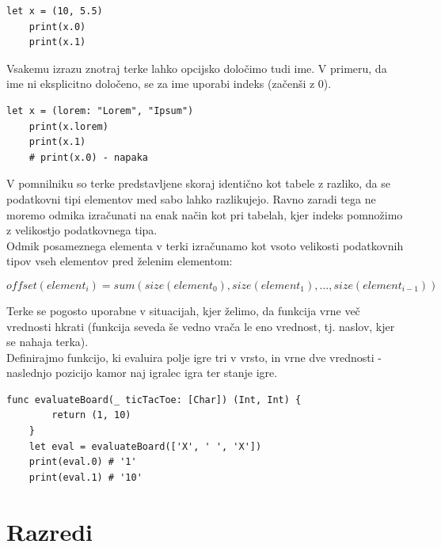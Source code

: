 \documentclass[a4paper, 12p]{book}
\begin{document}
\begin{lstlisting}[caption={Terka, sestavljena iz dveh vrednosti ({\ttfamily Int}, {\ttfamily Double}).}, captionpos=b, label={lst:tuple1}]
	let x = (10, 5.5)
	print(x.0)
	print(x.1)
\end{lstlisting}

Vsakemu izrazu znotraj terke lahko opcijsko določimo tudi ime. V primeru, da ime ni eksplicitno določeno, se za ime uporabi indeks (začenši z 0).

\begin{lstlisting}[caption={Terka s poimenovanim elementom.}, captionpos=b, label={lst:tuple2}]
	let x = (lorem: "Lorem", "Ipsum")
	print(x.lorem)
	print(x.1)
	# print(x.0) - napaka
\end{lstlisting}

\indent V pomnilniku so terke predstavljene skoraj identično kot tabele z razliko, da se podatkovni tipi elementov med sabo lahko razlikujejo. Ravno zaradi tega ne moremo odmika izračunati na enak način kot pri tabelah, kjer indeks pomnožimo z velikostjo podatkovnega tipa. \\
\indent Odmik posameznega elementa v terki izračunamo kot vsoto velikosti podatkovnih tipov vseh elementov pred želenim elementom:

\vspace{-5mm}
\[ offset ( element_i )  = sum ( size ( element_0 ), size( element_1 ), ..., size ( element_{i-1})) \]

Terke se pogosto uporabne v situacijah, kjer želimo, da funkcija vrne več vrednosti hkrati (funkcija seveda še vedno vrača le eno vrednost, tj. naslov, kjer se nahaja terka). \\
\indent Definirajmo funkcijo, ki evaluira polje igre tri v vrsto, in vrne dve vrednosti - naslednjo pozicijo kamor naj igralec igra ter stanje igre.

\begin{lstlisting}[caption={}, captionpos=b]
	func evaluateBoard(_ ticTacToe: [Char]) (Int, Int) {
	    return (1, 10)
	}
	let eval = evaluateBoard(['X', ' ', 'X'])
	print(eval.0) # '1'
	print(eval.1) # '10'
\end{lstlisting}

\section{Razredi}
\end{document}
